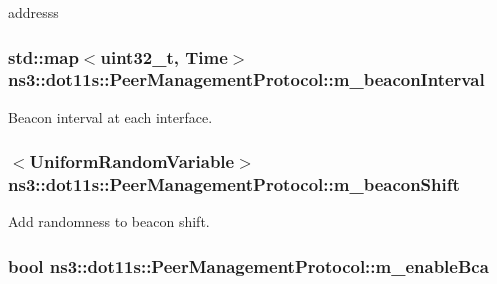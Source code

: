 addresss 

\subsubsection[{\texorpdfstring{m\+\_\+beacon\+Interval}{m_beaconInterval}}]{\setlength{\rightskip}{0pt plus 5cm}std\+::map$<$uint32\+\_\+t, {\bf Time}$>$ ns3\+::dot11s\+::\+Peer\+Management\+Protocol\+::m\+\_\+beacon\+Interval\hspace{0.3cm}{\ttfamily [private]}}\hypertarget{classns3_1_1dot11s_1_1PeerManagementProtocol_a915ce7d45ccdfa57b75bc300745974fa}{}\label{classns3_1_1dot11s_1_1PeerManagementProtocol_a915ce7d45ccdfa57b75bc300745974fa}


Beacon interval at each interface. 

\subsubsection[{\texorpdfstring{m\+\_\+beacon\+Shift}{m_beaconShift}}]{$<${\bf Uniform\+Random\+Variable}$>$ ns3\+::dot11s\+::\+Peer\+Management\+Protocol\+::m\+\_\+beacon\+Shift\hspace{0.3cm}{\ttfamily [private]}}\hypertarget{classns3_1_1dot11s_1_1PeerManagementProtocol_aa585248112e462ce3af050830715416b}{}\label{classns3_1_1dot11s_1_1PeerManagementProtocol_aa585248112e462ce3af050830715416b}


Add randomness to beacon shift. 

\subsubsection[{\texorpdfstring{m\+\_\+enable\+Bca}{m_enableBca}}]{\setlength{\rightskip}{0pt plus 5cm}bool ns3\+::dot11s\+::\+Peer\+Management\+Protocol\+::m\+\_\+enable\+Bca\hspace{0.3cm}{\ttfamily [private]}}\hypertarget{classns3_1_1dot11s_1_1PeerManagementProtocol_ae4cfbd2292a8d214ae8820fa6369763a}{}\label{classns3_1_1dot11s_1_1PeerManagementProtocol_ae4cfbd2292a8d214ae8820fa6369763a}


